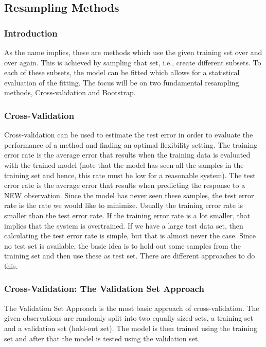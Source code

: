 {\subsection{Resampling Methods}
\subsubsection{Introduction}
As the name implies, these  are methods  which  use  the  given  training set over and over again. 
This is  achieved  by  sampling  that  set,  i.e., create  different  subsets.
To each  of  these  subsets,  the  model can be  fitted  which  allows  for  a statistical  evaluation  of  the  fitting.
The focus  will  be  on  two fundamental  resampling  methods, Cross-validation and Bootstrap.

\subsubsection{Cross-Validation}
Cross-validation can be used to estimate the test error in order to evaluate the performance of a method and finding an optimal flexibility  setting.
The training error rate is the average error  that results when the training data is  evaluated with the trained model (note  that the model has seen
all the samples in the training set and hence, this rate must be low for a reasonable  system).
The test error rate  is the average  error that results when predicting the response to a NEW observation. 
Since the model has never seen these samples, the test error  rate is the rate we would like to minimize.
Usually the training error rate is smaller than the test  error rate.
If the training error  rate is a lot smaller, that implies that the system  is overtrained.
If  we have a large test data set, then calculating the test error rate  is simple, but that is almost never the case.
Since no test set is available, the basic  idea  is  to  hold  out  some samples  from  the  training  set  and then  use  these  as  test  set.
There are different  approaches to do this.

\subsubsection{Cross-Validation: The Validation Set Approach}
The Validation Set Approach is the most basic approach of cross-validation.
The given observations are randomly split into two equally sized sets, a training set and a validation set (hold-out set).
The model is then trained using the training set and after that the model is tested using the validation set.

}
